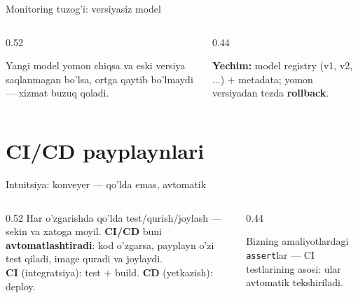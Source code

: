 \documentclass[aspectratio=169,11pt]{beamer}
\begin{document}
\begin{frame}{Monitoring tuzog'i: versiyasiz model}
  \begin{columns}[T]
    \begin{column}{0.52\textwidth}
      \begin{tcolorbox}[warnbox,title={Rollback imkonsiz}]
        \small
        Yangi model yomon chiqsa va eski versiya saqlanmagan bo'lsa, ortga
        qaytib bo'lmaydi --- xizmat buzuq qoladi.
      \end{tcolorbox}
    \end{column}
    \begin{column}{0.44\textwidth}
      \begin{tcolorbox}[okbox,top=2pt,bottom=2pt]
        \footnotesize
        \textbf{Yechim:} model registry (v1, v2, ...) $+$ metadata; yomon
        versiyadan tezda \textbf{rollback}.
      \end{tcolorbox}
    \end{column}
  \end{columns}
\end{frame}

\section[CI/CD]{CI/CD payplaynlari}

\begin{frame}{Intuitsiya: konveyer --- qo'lda emas, avtomatik}
  \begin{columns}[T]
    \begin{column}{0.52\textwidth}
      \small
      Har o'zgarishda qo'lda test/qurish/joylash --- sekin va xatoga moyil.
      \textbf{CI/CD} buni \textbf{avtomatlashtiradi}: kod o'zgarsa, payplayn
      o'zi test qiladi, image quradi va joylaydi.\\[5pt]
      \textbf{CI} (integratsiya): test $+$ build. \textbf{CD} (yetkazish): deploy.
    \end{column}
    \begin{column}{0.44\textwidth}
      \begin{tcolorbox}[okbox,top=2pt,bottom=2pt]
        \footnotesize
        Bizning amaliyotlardagi \texttt{assert}lar --- CI testlarining asosi:
        ular avtomatik tekshiriladi.
      \end{tcolorbox}
    \end{column}
  \end{columns}
\end{frame}
\end{document}
